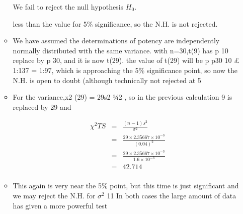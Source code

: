 \documentclass[a4paper,12pt]{article}
\begin{document}
\begin{enumerate}
\begin{itemize}
We fail to reject the null hypothesis $H_0$.


less than the value for 5\% significance, so the N.H. is not rejected.
\item We have assumed the determinations of potency are independently normally distributed
with the same variance.
with n=30,t(9) has
p
10 replace by
p
30, and it is now t(29). the value of t(29) will be
p
p30
10
£
1:137 = 1:97, which is approaching the 5\% significance point, so now the N.H. is open
to doubt (although technically not rejected at 5%
\item For the variance,x2
(29) = 29s2
¾2 , so in the previous calculation 9 is replaced by 29 and


\begin{eqnarray*}
\chi^2{TS} &=& \frac{(n-1)s^2}{\sigma^2}  \\
&=& \frac{29 \times 2.35667 \times 10^{-3}}{(0.04)^2}  \\
&=& \frac{29 \times 2.35667 \times 10^{-3}}{1.6 \times 10^{-3}}  \\
&=& 42.714 \\
\end{eqnarray*}

\item This again is very near the 5\% point, but this time is just
significant and we may reject the N.H. for $\sigma^2$
11
In both cases the large amount of data has given a more powerful test
\end{itemize}

\end{enumerate}
\end{document}
